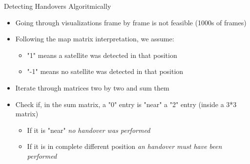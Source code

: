 \documentclass[NET,english,beameralt]{tumbeamer}
\begin{document}
\begin{frame}{Detecting Handovers Algoritmically}
    \begin{itemize}
        \item Going through visualizations frame by frame is not feasible (1000s of frames)
        \item Following the map matrix interpretation, we assume:
        \begin{itemize}
            \item "1" means a satellite was detected in that position
            \item  "-1" means no satellite was detected in that position
        \end{itemize} 
        \item Iterate through matrices two by two and sum them
        \item Check if, in the sum matrix, a "0" entry is "near" a "2" entry (inside a 3*3 matrix)
            \begin{itemize}
                \item If it is "near" \emph{no handover was performed}
                \item If it is in complete different position \emph{an handover must have been performed}
            \end{itemize}
    \end{itemize}
\end{frame}
\end{document}
